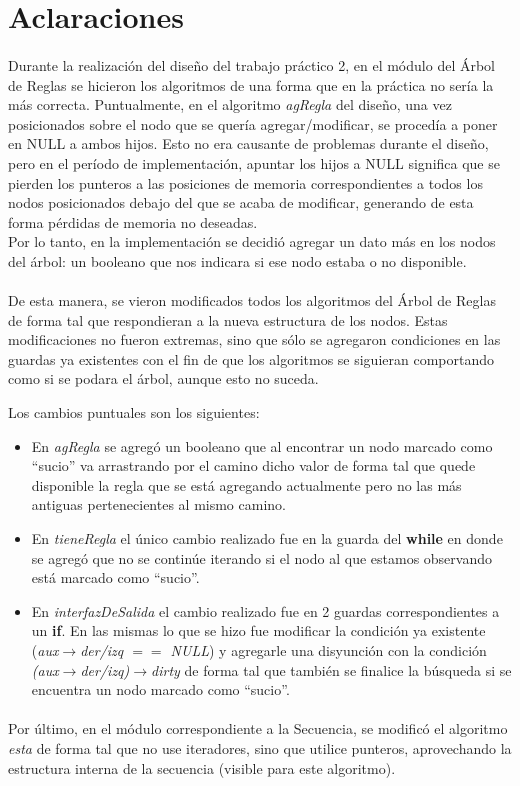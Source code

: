 \section{Aclaraciones}

\paragraph{}
Durante la realizaci\'on del dise\~no del trabajo pr\'actico 2, en el m\'odulo del \'Arbol de Reglas se hicieron los algoritmos de una forma que en la pr\'actica no ser\'ia la m\'as correcta. Puntualmente, en el algoritmo \textit{agRegla} del dise\~no, una vez posicionados sobre el nodo que se quer\'ia agregar/modificar, se proced\'ia a poner en NULL a ambos hijos. Esto no era causante de problemas durante el dise\~no, pero en el per\'iodo de implementaci\'on, apuntar los hijos a NULL significa que se pierden los punteros a las posiciones de memoria correspondientes a todos los nodos posicionados debajo del que se acaba de modificar, generando de esta forma p\'erdidas de memoria no deseadas.\\
Por lo tanto, en la implementaci\'on se decidi\'o agregar un dato m\'as en los nodos del \'arbol: un booleano que nos indicara si ese nodo estaba o no disponible.

\paragraph{}
De esta manera, se vieron modificados todos los algoritmos del \'Arbol de Reglas de forma tal que respondieran a la nueva estructura de los nodos. Estas modificaciones no fueron extremas, sino que s\'olo se agregaron condiciones en las guardas ya existentes con el fin de que los algoritmos se siguieran comportando como si se podara el \'arbol, aunque esto no suceda.

Los cambios puntuales son los siguientes:

\begin{itemize}
 \item En \textit{agRegla} se agreg\'o un booleano que al encontrar un nodo marcado como ``sucio'' va arrastrando por el camino dicho valor de forma tal que quede disponible la regla que se est\'a agregando actualmente pero no las m\'as antiguas pertenecientes al mismo camino.
 \item En \textit{tieneRegla} el \'unico cambio realizado fue en la guarda del \textbf{while} en donde se agreg\'o que no se contin\'ue iterando si el nodo al que estamos observando est\'a marcado como ``sucio''.
 \item En \textit{interfazDeSalida} el cambio realizado fue en 2 guardas correspondientes a un \textbf{if}. En las mismas lo que se hizo fue modificar la condici\'on ya existente (\textit{aux$\rightarrow$der/izq $==$ NULL}) y agregarle una disyunci\'on con la condici\'on \textit{(aux$\rightarrow$der/izq)$\rightarrow$dirty} de forma tal que tambi\'en se finalice la b\'usqueda si se encuentra un nodo marcado como ``sucio''.
\end{itemize}

\paragraph{}
Por \'ultimo, en el m\'odulo correspondiente a la Secuencia, se modific\'o el algoritmo \textit{esta} de forma tal que no use iteradores, sino que utilice punteros, aprovechando la estructura interna de la secuencia (visible para este algoritmo).
